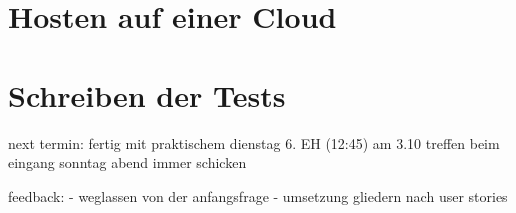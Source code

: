 \section{Hosten auf einer Cloud}

\section{Schreiben der Tests}

next termin:
    fertig mit praktischem dienstag 6. EH (12:45) am 3.10 treffen beim eingang
    sonntag abend immer schicken

feedback:
- weglassen von der anfangsfrage
- umsetzung gliedern nach user stories